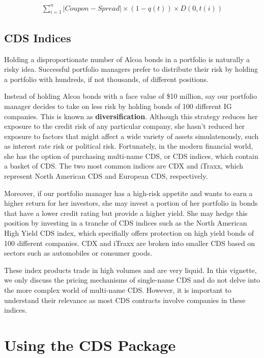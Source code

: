 \documentclass{jss}
\begin{document}
\begin{equation}
 \begin{aligned}
   \displaystyle\sum_{i=1}^{n}|Coupon - Spread| \times (1-q(t)) \times D(0, t(i))
    \end{aligned}
\end{equation}

\subsection{CDS Indices}
\label{sec:CDSIndices}

Holding a disproportionate number of Alcoa bonds in a portfolio is naturally a risky idea. Successful portfolio managers prefer to distribute their risk by holding a portfolio with hundreds, if not thousands, of different positions. 

Instead of holding Alcoa bonds with a face value of \$10 million, say our portfolio manager decides to take on less risk by holding bonds of 100 different IG companies. This is known as \textbf{diversification}. Although this strategy reduces her exposure to the credit risk of any particular company, she hasn't reduced her exposure to factors that might affect a wide variety of assets simulatenously, such as interest rate risk or political risk. Fortunately, in the modern financial world, she has the option of purchasing multi-name CDS, or CDS indices, which contain a basket of CDS. The two most common indices are CDX and iTraxx, which represent North American CDS and European CDS, respectively.
 
Moreover, if our portfolio manager has a high-risk appetite and wants to earn a higher return for her investors, she may invest a portion of her portfolio in bonds that have a lower credit rating but provide a higher yield. She may hedge this position by investing in a tranche of CDS indices such as the North American High Yield CDS index, which specifially offers protection on high yield bonds of 100 different companies. CDX and iTraxx are broken into smaller CDS based on sectors such as automobiles or consumer goods.

These index products trade in high volumes and are very liquid. In this vignette, we only discuss the pricing mechanisms of single-name CDS and do not delve into the more complex world of multi-name CDS. However, it is important to understand their relevance as most CDS contracts involve companies in these indices.

\newpage
\section{Using the CDS Package}
\label{CDSpkg}
\end{document}
